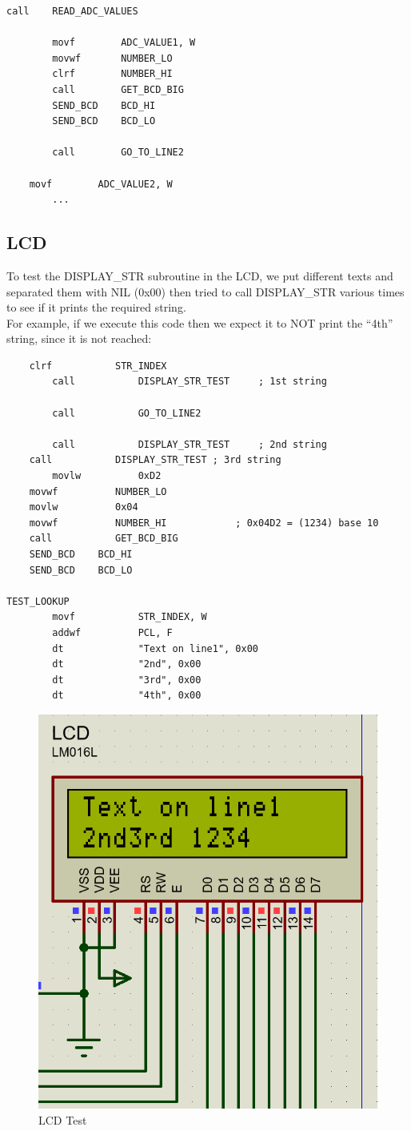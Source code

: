 \documentclass[a4paper, 12pt]{article}
\begin{document}
\begin{lstlisting}
call	READ_ADC_VALUES
    
    	movf		ADC_VALUE1, W
    	movwf	 	NUMBER_LO
    	clrf		NUMBER_HI
    	call		GET_BCD_BIG
    	SEND_BCD	BCD_HI
    	SEND_BCD	BCD_LO
    
    	call		GO_TO_LINE2
    
	movf		ADC_VALUE2, W
    	...

\end{lstlisting}


\newpage


\subsection{LCD}
To test the DISPLAY\_STR subroutine in the LCD, we put different texts and separated them with NIL (0x00) then tried to call DISPLAY\_STR various times to see if it prints the required string. \\

For example, if we execute this code then we expect it to NOT print the “4th” string, since it is not reached:

\begin{lstlisting}
	clrf    	   STR_INDEX
    	call    	   DISPLAY_STR_TEST    	; 1st string
    
    	call    	   GO_TO_LINE2
     
    	call    	   DISPLAY_STR_TEST    	; 2nd string
   	call    	   DISPLAY_STR_TEST	; 3rd string
    	movlw    	   0xD2
	movwf    	   NUMBER_LO
	movlw    	   0x04  
	movwf    	   NUMBER_HI        	; 0x04D2 = (1234) base 10
	call    	   GET_BCD_BIG
	SEND_BCD    BCD_HI
	SEND_BCD    BCD_LO

TEST_LOOKUP
    	movf    	   STR_INDEX, W
    	addwf    	   PCL, F
    	dt        	   "Text on line1", 0x00
    	dt        	   "2nd", 0x00
    	dt         	   "3rd", 0x00
    	dt        	   "4th", 0x00

\end{lstlisting}

\begin{figure}[H]
\centering
\includegraphics[width=0.45\linewidth]{images/LCD_Test}
\caption{LCD Test}
\end{figure}
\end{document}
